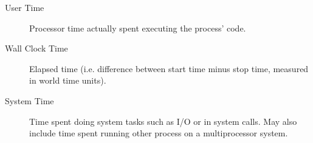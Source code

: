 
\begin{description}

\item [User Time] Processor time actually spent executing the process' code.

\item [Wall Clock Time] Elapsed time (i.e. difference between start time minus
stop time, measured in world time units).

\item [System Time] Time spent doing system tasks such as I/O or in system calls.  May also
include time spent running other process on a multiprocessor system.

\end{description}



